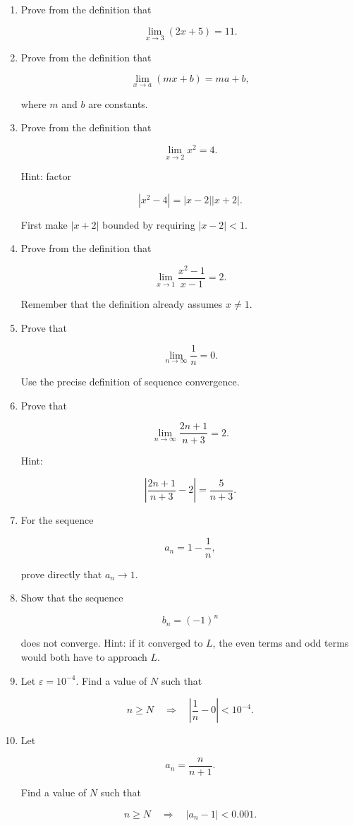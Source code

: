 \begin{enumerate}
\item Prove from the definition that

\[
\lim_{x\to3}(2x+5)=11.
\]

\item Prove from the definition that

\[
\lim_{x\to a}(mx+b)=ma+b,
\]

where \(m\) and \(b\) are constants.

\item Prove from the definition that

\[
\lim_{x\to2}x^2=4.
\]

Hint: factor

\[
|x^2-4|=|x-2||x+2|.
\]

First make \(|x+2|\) bounded by requiring \(|x-2|<1\).

\item Prove from the definition that

\[
\lim_{x\to1}\frac{x^2-1}{x-1}=2.
\]

Remember that the definition already assumes \(x\neq1\).

\item Prove that

\[
\lim_{n\to\infty}\frac1n=0.
\]

Use the precise definition of sequence convergence.

\item Prove that

\[
\lim_{n\to\infty}\frac{2n+1}{n+3}=2.
\]

Hint:

\[
\left|\frac{2n+1}{n+3}-2\right|
=
\frac5{n+3}.
\]

\item For the sequence

\[
a_n=1-\frac1n,
\]

prove directly that \(a_n\to1\).

\item Show that the sequence

\[
b_n=(-1)^n
\]

does not converge.  Hint: if it converged to \(L\), the even terms and odd terms would both have to approach \(L\).

\item Let \(\varepsilon=10^{-4}\).  Find a value of \(N\) such that

\[
n\ge N
\quad\Longrightarrow\quad
\left|\frac1n-0\right|<10^{-4}.
\]

\item Let

\[
a_n=\frac{n}{n+1}.
\]

Find a value of \(N\) such that

\[
n\ge N
\quad\Longrightarrow\quad
|a_n-1|<0.001.
\]
\end{enumerate}

